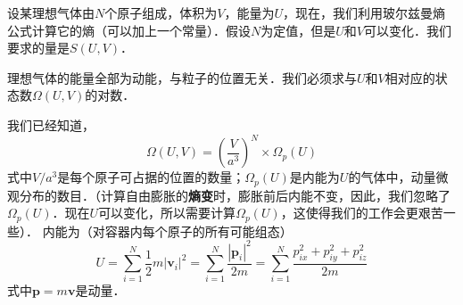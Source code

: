

设某理想气体由$N $个原子组成，体积为$V$，能量为$U$，现在，我们利用玻尔兹曼熵公式计算它的熵（可以加上一个常量）．假设$N $为定值，但是$U $和$V $可以变化．我们要求的量是$S(U,V)$．

理想气体的能量全部为动能，与粒子的位置无关．我们必须求与$U$和$V$相对应的状态数$\Omega(U,V)$的对数．

我们已经知道，
\begin{equation}
\Omega \left( U,V \right) =\left( \frac{V}{a^3} \right) ^N\times \Omega _p\left( U \right) 
\end{equation}
式中$V/a^3$是每个原子可占据的位置的数量；$\Omega_p(U)$是内能为$U$的气体中，动量微观分布的数目．（计算自由膨胀的\textbf{熵变}时，膨胀前后内能不变，因此，我们忽略了$\Omega_p(U)$．现在$U$可以变化，所以需要计算$\Omega_p(U)$，这使得我们的工作会更艰苦一些）．
内能为（对容器内每个原子的所有可能组态）
\begin{equation}
U=\sum_{i=1}^N{\frac{1}{2}m\left| \boldsymbol{v}_i \right|^2}=\sum_{i=1}^N{\frac{\left| \boldsymbol{p}_i \right|^2}{2m}}=\sum_{i=1}^N{\frac{p_{ix}^{2}+p_{iy}^{2}+p_{iz}^{2}}{2m}}
\end{equation}
式中$\boldsymbol p = m\boldsymbol v$是动量．

